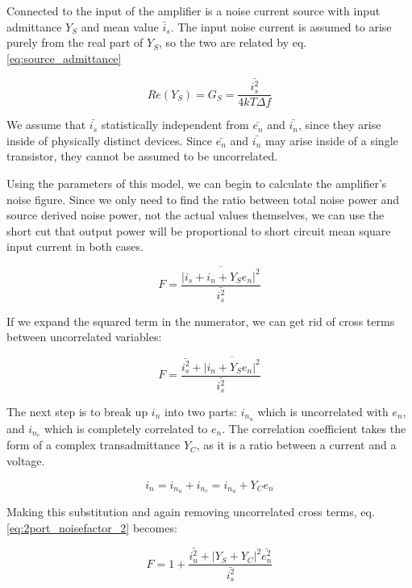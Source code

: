 Connected to the input of the amplifier is a noise current source with input admittance $Y_S$ and mean value
$\bar{i}_s$. The input noise current is assumed to arise purely from the real part of $Y_S$, so the two are related by eq.
\ref{eq:source_admittance}

\begin{equation}\label{eq:source_admittance}
    Re(Y_S) = G_S = \frac{\bar{i_s^2}}{4kT\Delta f}
\end{equation}

We assume that $\bar{i_s}$ statistically independent from $\bar{e_n}$ and $\bar{i_n}$, since they arise inside of
physically distinct devices. Since $\bar{e_n}$ and $\bar{i_n}$ may arise inside of a single transistor, they cannot be
assumed to be uncorrelated.

Using the parameters of this model, we can begin to calculate the amplifier's noise figure. Since we only need to find
the ratio between total noise power and source derived noise power, not the actual values themselves, we can use the
short cut that output power will be proportional to short circuit mean square input current in both cases.

\begin{equation}\label{eq:2port_noisefactor}
    F = \frac{\overline{|i_s + i_n + Y_S e_n|^2}}{\bar{i_s^2}}
\end{equation}

If we expand the squared term in the numerator, we can get rid of cross terms between uncorrelated variables:

\begin{equation}\label{eq:2port_noisefactor_2}
    F = \frac{\bar{i_s^2} + \overline{|i_n + Y_S e_n|^2}}{\bar{i_s^2}}
\end{equation}

The next step is to break up $i_n$ into two parts: $i_{n_u}$ which is uncorrelated with $e_n$, and $i_{n_c}$ which is
completely correlated to $e_n$. The correlation coefficient takes the form of a complex transadmittance $Y_C$, as it is a ratio between
a current and a voltage.

\begin{equation}\label{eq:cor_uncoor}
    i_n = i_{n_u} + i_{n_c} = i_{n_u} + Y_C e_n
\end{equation}

Making this substitution and again removing uncorrelated cross terms, eq. \ref{eq:2port_noisefactor_2} becomes:

\begin{equation}\label{eq:2port_noisefactor_3}
    F = 1 + \frac{\bar{i_u^2} + |Y_S + Y_C|^2 \bar{e_n^2}}{\bar{i_s^2}}
\end{equation}

